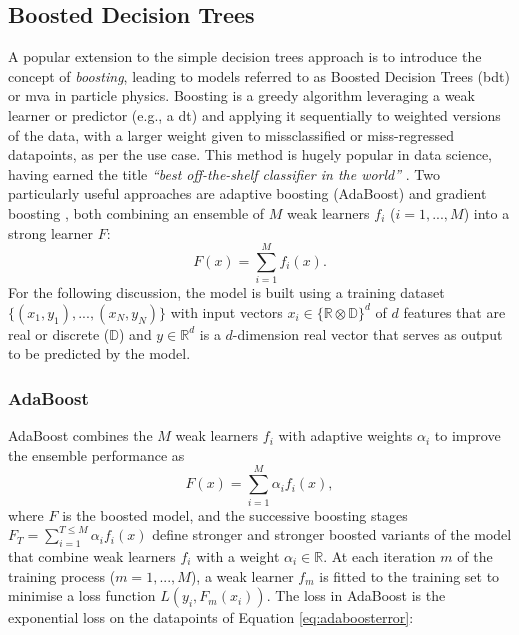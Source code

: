 \subsection{Boosted Decision Trees}
A popular extension to the simple decision trees approach is to introduce the concept of \textit{boosting}, leading to models referred to as Boosted Decision Trees (\gls{bdt}) or \gls{mva} in particle physics. Boosting is a greedy algorithm leveraging a weak learner or predictor (e.g., a \gls{dt}) and applying it sequentially to weighted versions of the data, with a larger weight given to missclassified or miss-regressed datapoints, as per the use case. This method is hugely popular in data science, having earned the title \textit{``best off-the-shelf classifier in the world''} \cite{baggingML}. Two particularly useful approaches are adaptive boosting (AdaBoost) \cite{Adaboost} and gradient boosting \cite{gradientBoosting}, both combining an ensemble of $M$ weak learners $f_i$ ($i = 1, ..., M$) into a strong learner $F$: \[F(x) = \sum_{i=1}^M f_i(x).\] For the following discussion, the model is built using a training dataset $ \{(x_1, y_1), ..., (x_N, y_N)\}$ with input vectors $x_i \in \{\mathbb{R} \otimes \mathbb{D}\}^d$ of $d$ features that are real or discrete ($\mathbb{D}$) and $y \in \mathbb{R}^d$ is a $d$-dimension real vector that serves as output to be predicted by the model.

\subsubsection{AdaBoost}
AdaBoost combines the $M$ weak learners $f_i$ with adaptive weights $\alpha_i$ to improve the ensemble performance as \[F(x) = \sum_{i=1}^M \alpha_i f_i(x),\] where $F$ is the boosted model, and the successive boosting stages $F_T = \sum_{i=1}^{T \leq M} \alpha_i f_i(x)$ define stronger and stronger boosted variants of the model that combine weak learners $f_i$ with a weight $\alpha_i \in \mathbb{R}$. At each iteration $m$ of the training process ($m = 1, ..., M$), a weak learner $f_m$ is fitted to the training set to minimise a loss function $L(y_i, F_{m}(x_i))$. The loss in AdaBoost is the exponential loss on the datapoints of Equation \ref{eq:adaboosterror}:

